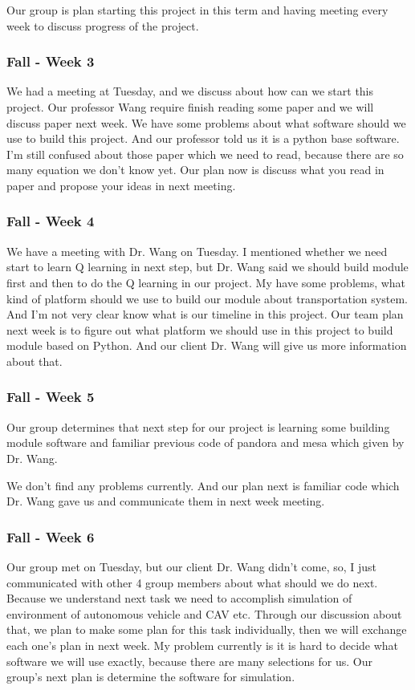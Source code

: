 \documentclass[onecolumn, draftclsnofoot,10pt, compsoc]{IEEEtran}
\begin{document}
Our group is plan starting this project in this term and having meeting every week to discuss progress of the project.
\subsubsection{Fall - Week 3}
We had a meeting at Tuesday, and we discuss about how can we start this project.
Our professor Wang require finish reading some paper and we will discuss paper next week.
We have some problems about what software should we use to build this project.
And our professor told us it is a python base software.
I'm still confused about those paper which we need to read, because there are so many equation we don't know yet.
Our plan now is discuss what you read in paper and propose your ideas in next meeting.
\subsubsection{Fall - Week 4}
We have a meeting with Dr. Wang on Tuesday.
I mentioned whether we need start to learn Q learning in next step, but Dr. Wang said we should build module first and then to do the Q learning in our project.
My have some problems, what kind of platform should we use to build our module about transportation system.
And I'm not very clear know what is our timeline in this project.
Our team plan next week is to figure out what platform we should use in this project to build module based on Python.
And our client Dr. Wang will give us more information about that.
\subsubsection{Fall - Week 5}
Our group determines that next step for our project is learning some building module software and familiar previous code of pandora and mesa which given by Dr. Wang.

We don't find any problems currently.
And our plan next is familiar code which Dr. Wang gave us and communicate them in next week meeting.
\subsubsection{Fall - Week 6}
Our group met on Tuesday, but our client Dr. Wang didn't come, so, I just communicated with other 4 group members about what should we do next.
Because we understand next task we need to accomplish simulation of environment of autonomous vehicle and CAV etc.
Through our discussion about that, we plan to make some plan for this task individually, then we will exchange each one's plan in next week.
My problem currently is it is hard to decide what software we will use exactly, because there are many selections for us.
Our group's next plan is determine the software for simulation.
\end{document}
